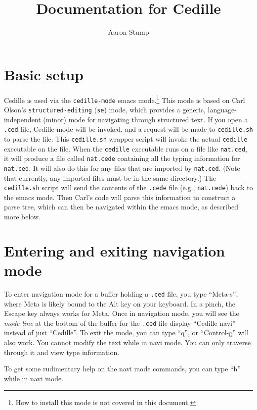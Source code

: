 \documentclass{article}
\begin{document}
\title{Documentation for Cedille}

\author{Aaron Stump}

\maketitle

\section{Basic setup}

Cedille is used via the \verb|cedille-mode| emacs mode.\footnote{How
  to install this mode is not covered in this document.}  This mode is
based on Carl Olson's \verb|structured-editing| (\verb|se|) mode,
which provides a generic, language-independent (minor) mode for
navigating through structured text.  If you open a \verb|.ced| file,
Cedille mode will be invoked, and a request will be made to
\verb|cedille.sh| to parse the file.  This \verb|cedille.sh| wrapper
script will invoke the actual \verb|cedille| executable on the file.
When the \verb|cedille| executable runs on a file like \verb|nat.ced|,
it will produce a file called \verb|nat.cede| containing all the
typing information for \verb|nat.ced|.  It will also do this for any
files that are imported by \verb|nat.ced|.  (Note that currently, any
imported files must be in the same directory.)  The \verb|cedille.sh|
script will send the contents of the \verb|.cede| file (e.g.,
\verb|nat.cede|) back to the emacs mode.  Then Carl's code will parse
this information to construct a parse tree, which can then be
navigated within the emacs mode, as described more below.

\section{Entering and exiting navigation mode}

To enter navigation mode for a buffer holding a \verb|.ced| file, you
type ``Meta-s'', where Meta is likely bound to the Alt key on your
keyboard.  In a pinch, the Escape key always works for Meta.  Once in
navigation mode, you will see the \emph{mode line} at the bottom of
the buffer for the \verb|.ced| file display ``Cedille navi'' instead
of just ``Cedille''.  To exit the mode, you can type ``q'', or
``Control-g'' will also work.  You cannot modify the text while in
navi mode.  You can only traverse through it and view type
information.

To get some rudimentary help on the navi mode commands, you can type
``h'' while in navi mode.
\end{document}
